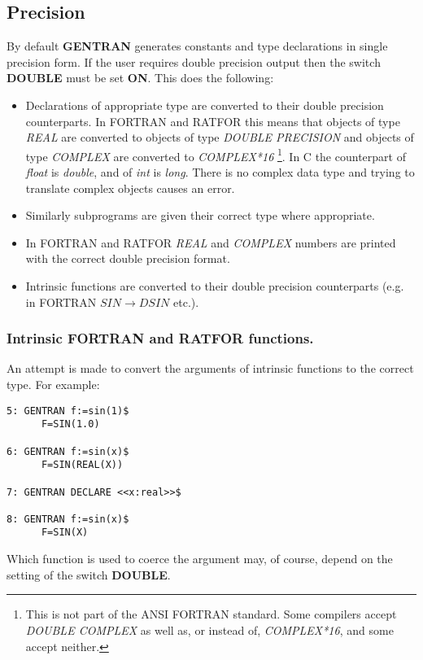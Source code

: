 \subsection{Precision}
\label{precision}
 
By default {\bf GENTRAN} generates constants and type declarations in
single precision form.  If the user requires double precision output
then the switch {\bf DOUBLE} must be set {\bf ON}.  This does the
following:

\begin{itemize}
\item Declarations of appropriate type are converted to their double
precision counterparts.  In FORTRAN and RATFOR this means that objects of type
{\it REAL\/} are converted to objects of type {\it DOUBLE PRECISION\/}
and objects of type {\it COMPLEX\/} are converted to {\it COMPLEX*16\/}
\footnote{This is not part of the ANSI FORTRAN standard.  Some compilers
accept {\it DOUBLE COMPLEX\/} as well as, or instead of, {\it COMPLEX*16\/},
and some accept neither.}.  
In C the counterpart of {\it float\/} is {\it double\/}, and of {\it int\/}
is {\it long\/}.  There is no complex data type and trying to translate complex
objects causes an error.
\item Similarly subprograms are given their correct type where appropriate.
\item In FORTRAN and RATFOR {\it REAL\/} and {\it COMPLEX\/} numbers are
printed with the correct double precision format.
\item Intrinsic functions are converted to their double precision counterparts
(e.g. in FORTRAN $SIN \rightarrow DSIN$ etc.).
\end{itemize}

\subsubsection{Intrinsic FORTRAN and RATFOR functions.}
An attempt is made to convert the arguments of intrinsic functions to
the correct type.  For example:
\begin{verbatim}
5: GENTRAN f:=sin(1)$
      F=SIN(1.0)

6: GENTRAN f:=sin(x)$
      F=SIN(REAL(X))

7: GENTRAN DECLARE <<x:real>>$

8: GENTRAN f:=sin(x)$
      F=SIN(X)
\end{verbatim}
Which function is used to coerce the argument may, of course, depend on the
setting of the switch {\bf DOUBLE}.

